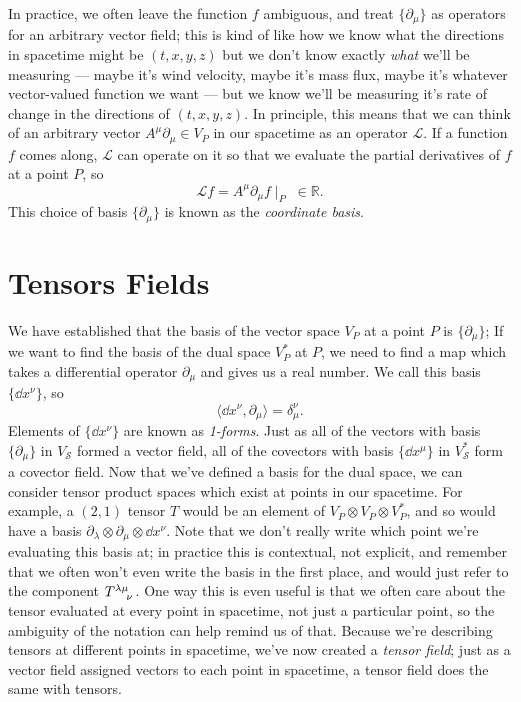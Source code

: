In practice, we often leave the function $f$ ambiguous, and treat $\{\partial_\mu\}$ as operators for an arbitrary vector field; this is kind of like how we know what the directions in spacetime might be $(t,x,y,z)$ but we don't know exactly \emph{what} we'll be measuring --- maybe it's wind velocity, maybe it's mass flux, maybe it's whatever vector-valued function we want --- but we know we'll be measuring it's rate of change in the directions of $(t,x,y,z)$.
In principle, this means that we can think of an arbitrary vector $A^\mu \partial_\mu \in V_P$ in our spacetime as an operator $\mathcal{L}$.
If a function $f$ comes along, $\mathcal{L}$ can operate on it so that we evaluate the partial derivatives of $f$ at a point $P$, so
\[ \mathcal{L}f = A^\mu \partial_\mu f \mid_P \;\in \mathbb{R}. \]
This choice of basis $\{\partial_\mu\}$ is known as the \emph{coordinate basis}.

\section{Tensors Fields}
We have established that the basis of the vector space $V_P$ at a point $P$ is $\{\partial_\mu\}$;
If we want to find the basis of the dual space $V^*_P$ at $P$, we need to find a map which takes a differential operator $\partial_\mu$ and gives us a real number.
We call this basis $\{\dd{x}^\nu\}$, so
\[ \langle \dd{x}^\nu, \partial_\mu \rangle = \delta^\nu_\mu. \]
Elements of $\{\dd{x}^\nu\}$ are known as \emph{1-forms}. Just as all of the vectors with basis $\{\partial_\mu\}$ in $V_\mathcal{S}$ formed a vector field, all of the covectors with basis $\{\dd{x}^\mu\}$ in $V^*_\mathcal{S}$ form a covector field.
Now that we've defined a basis for the dual space, we can consider tensor product spaces which exist at points in our spacetime.
For example, a $(2,1)$ tensor $T$ would be an element of $V_P \otimes V_P \otimes V^*_P$, and so would have a basis $\partial_\lambda \otimes \partial_\mu \otimes \dd{x}^\nu$.
Note that we don't really write which point we're evaluating this basis at; in practice this is contextual, not explicit, and remember that we often won't even write the basis in the first place, and  would just refer to the component $\tensor{T}{^{\lambda\mu}_\nu}$.
One way this is even useful is that we often care about the tensor evaluated at every point in spacetime, not just a particular point, so the ambiguity of the notation can help remind us of that.
Because we're describing tensors at different points in spacetime, we've now created a \emph{tensor field}; just as a vector field assigned vectors to each point in spacetime, a tensor field does the same with tensors.


